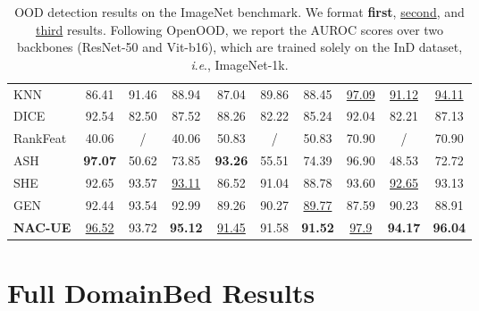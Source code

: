 \documentclass{article} \usepackage{iclr2024_conference,times}
\newcommand{\ie}{\textit{i}.\textit{e}.}
\begin{document}
\begin{table*}[h]
{\begin{tabular}{l ccc  ccc  ccc}
			KNN & 86.41 & 91.46 & 88.94 & 87.04 & 89.86 & 88.45  & \underline{97.09} & \underline{91.12} & \underline{94.11} \\ 
			DICE & 92.54 & 82.50 & 87.52 & 88.26 & 82.22 & 85.24  & 92.04 & 82.21 & 87.13 \\ 
			RankFeat & 40.06 & / & 40.06 & 50.83 & / & 50.83  & 70.90 & / & 70.90 \\ 
			ASH & \textbf{97.07} & 50.62 & 73.85 &\textbf{ 93.26} & 55.51 & 74.39  & 96.90 & 48.53 & 72.72 \\ 
			SHE & 92.65 & 93.57 & \underline{93.11} & 86.52 & 91.04 & 88.78  & 93.60 & \underline{92.65} & 93.13 \\ 
			GEN & 92.44 & 93.54 & 92.99 & 89.26 & 90.27 & \underline{89.77}  & 87.59 & 90.23 & 88.91 \\ 
			\rowcolor{LightGray}
			\textbf{NAC-UE} & \underline{96.52} & 93.72 & \textbf{95.12} & \underline{91.45} & 91.58 & \textbf{91.52} & \underline{97.9} & \textbf{94.17} & \textbf{96.04} \\ 
			\bottomrule
		\end{tabular}
		
	}
	\caption{OOD detection results on the ImageNet benchmark. We format \textbf{first}, \underline{second}, and \underline{third} results. Following OpenOOD, we report the AUROC scores over two backbones (ResNet-50 and Vit-b16), which are trained solely on the InD dataset, \ie, ImageNet-1k. }
	\label{Appendix:Tab:Full_OOD_Detection_ImageNet}
\end{table*}













\newpage
\section{Full DomainBed Results}
\label{Appendix:Sec_DomainBed_Results}
\end{document}
